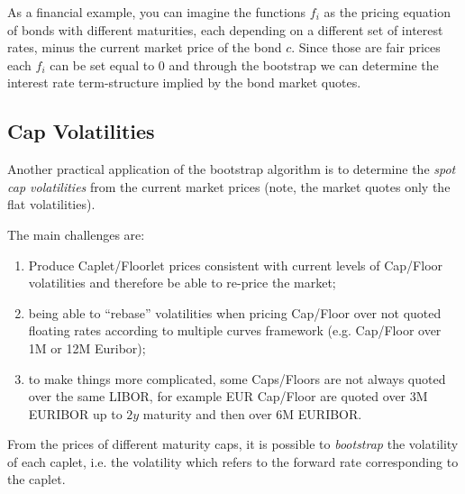 \documentclass[12pt,a4paper]{article}
\begin{document}
As a financial example, you can imagine the functions $f_i$ as the pricing equation of bonds with different maturities, each depending on a different set of interest rates, minus the current market price of the bond $c$. Since those are fair prices each $f_i$ can be set equal to 0 and through the bootstrap we can determine the interest rate term-structure implied by the bond market quotes. 

\subsection{Cap Volatilities}

Another practical application of the bootstrap algorithm is to determine the \emph{spot cap volatilities} from the current market prices (note, the market quotes only the flat volatilities).

The main challenges are:
\begin{enumerate}
	\item Produce Caplet/Floorlet prices consistent with current levels of Cap/Floor volatilities and therefore be able to re-price the market;
	\item being able to “rebase” volatilities when pricing Cap/Floor over not quoted floating rates according to multiple curves framework (e.g. Cap/Floor over 1M or 12M Euribor);
	\item to make things more complicated, some Caps/Floors are not always quoted over the same LIBOR, for example EUR Cap/Floor are quoted over 3M EURIBOR up to $2y$ maturity and then over 6M EURIBOR.
\end{enumerate}

From the prices of different maturity caps, it is possible to \emph{bootstrap} the volatility of each caplet, i.e. the volatility which refers to the forward rate corresponding to the caplet.
\end{document}
